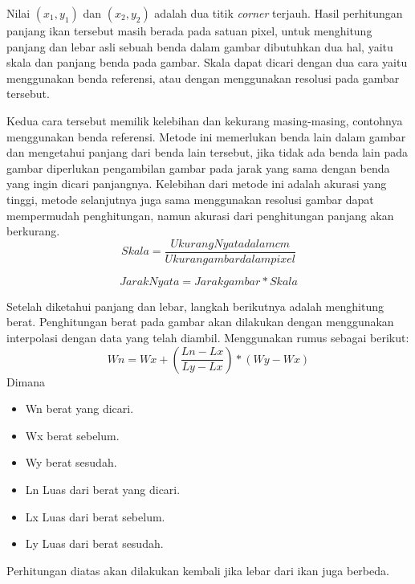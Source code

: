     Nilai \((x_1, y_1)\) dan \((x_2, y_2)\) adalah dua titik \emph{corner} terjauh. Hasil perhitungan panjang ikan tersebut masih berada pada satuan pixel, untuk menghitung panjang dan lebar asli sebuah benda dalam gambar dibutuhkan dua hal, yaitu skala dan panjang benda pada gambar.
Skala dapat dicari dengan dua cara yaitu menggunakan benda referensi, atau dengan menggunakan resolusi pada gambar tersebut.
    
    Kedua cara tersebut memilik kelebihan dan kekurang masing-masing, contohnya menggunakan benda referensi.
 Metode ini memerlukan benda lain dalam gambar dan mengetahui panjang dari benda lain tersebut, jika tidak ada benda lain pada gambar diperlukan pengambilan gambar pada jarak yang sama dengan benda yang ingin dicari panjangnya.
 Kelebihan dari metode ini adalah akurasi yang tinggi, metode selanjutnya juga sama menggunakan resolusi gambar dapat mempermudah penghitungan, namun akurasi dari penghitungan panjang akan berkurang.
\begin{equation*}
    Skala = \frac{Ukurang Nyata dalam cm}{Ukuran gambar dalam pixel}
\end{equation*}

\begin{equation}
    Jarak Nyata = Jarak gambar * Skala
\end{equation}

    Setelah diketahui panjang dan lebar, langkah berikutnya adalah menghitung berat. Penghitungan berat pada gambar akan dilakukan dengan menggunakan interpolasi dengan data yang telah diambil. Menggunakan rumus sebagai berikut:
\begin{equation}
    Wn = Wx + (\frac{Ln - Lx}{Ly - Lx}) * (Wy - Wx)
\end{equation}
Dimana 
\begin{itemize} 
    \item Wn berat yang dicari.
    \item Wx berat sebelum.
    \item Wy berat sesudah.
    \item Ln Luas dari berat yang dicari.
    \item Lx Luas dari berat sebelum.
    \item Ly Luas dari berat sesudah.
\end{itemize}
    Perhitungan diatas akan dilakukan kembali jika lebar dari ikan juga berbeda.

